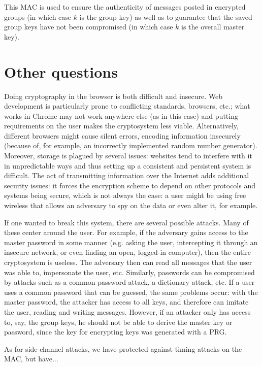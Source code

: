 \documentclass{amsart}
\begin{document}
This MAC is used to ensure the authenticity of messages posted in encrypted groups (in which case $k$ is the group key) as well as to guarantee that the saved group keys have not been compromised (in which case $k$ is the overall master key).


\section{Other questions}
Doing cryptography in the browser is both difficult and insecure. Web development is particularly prone to conflicting standards, browsers, etc.; what works in Chrome may not work anywhere else (as in this case) and putting requirements on the user makes the cryptosystem less viable. Alternatively, different browsers might cause silent errors, encoding information insecurely (because of, for example, an incorrectly implemented random number generator). Moreover, storage is plagued by several issues: websites tend to interfere with it in unpredictable ways and thus setting up a consistent and persistent system is difficult. The act of transmitting information over the Internet adds additional security issues: it forces the encryption scheme to depend on other protocols and systems being secure, which is not always the case: a user might be using free wireless that allows an adversary to spy on the data or even alter it, for example.

If one wanted to break this system, there are several possible attacks. Many of these center around the user. For example, if the adversary gains access to the master password in some manner (e.g. asking the user, intercepting it through an insecure network, or even finding an open, logged-in computer), then the entire cryptosystem is useless. The adversary then can read all messages that the user was able to, impersonate the user, etc. Similarly, passwords can be compromised by attacks such as a common password attack, a dictionary attack, etc. If a user uses a common password that can be guessed, the same problems occur: with the master password, the attacker has access to all keys, and therefore can imitate the user, reading and writing messages. However, if an attacker only has access to, say, the group keys, he should not be able to derive the master key or password, since the key for encrypting keys was generated with a PRG.

As for side-channel attacks, we have protected against timing attacks on the MAC, but have...
\end{document}
